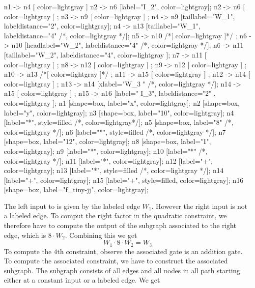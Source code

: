 \begin{example}
\begin{center}
{        n1 -> n4 [ color=lightgray ]
	n2 -> n6 [label="I_2", color=lightgray];
	n2 -> n6 [ color=lightgray ] ;
	n3 -> n9 [ color=lightgray ] ;
	n4 -> n9 [taillabel="W_1", labeldistance="2", color=lightgray];
	n4 -> n13 [taillabel="W_1", labeldistance="4" /*, color=lightgray */];
	n5 -> n10 /*[ color=lightgray ]*/ ;
	n6 -> n10 [headlabel="W_2", labeldistance="4" /*, color=lightgray */];
	n6 -> n11 [taillabel="W_2", labeldistance="4", color=lightgray ];
	n7 -> n11 [ color=lightgray ] ;
	n8 -> n12 [ color=lightgray ] ;
	n9 -> n12 [ color=lightgray ] ;
	n10 -> n13 /*[ color=lightgray ]*/ ; 
	n11 -> n15 [ color=lightgray ] ;
	n12 -> n14 [ color=lightgray ] ;	
	n13 -> n14 [xlabel="W_3  "  /*, color=lightgray */];
	n14 -> n15 [ color=lightgray ] ;
	n15 -> n16 [label="  I_3", labeldistance="2" , color=lightgray ];
	n1 [shape=box, label="x", color=lightgray];
	n2 [shape=box, label="y", color=lightgray];
	n3 [shape=box, label="10", color=lightgray];
	n4 [label="*", style=filled /*, color=lightgray*/];
	n5 [shape=box, label="8" /*, color=lightgray */];
	n6 [label="*", style=filled /*, color=lightgray */];
	n7 [shape=box, label="12", color=lightgray];
	n8 [shape=box, label="1", color=lightgray];
	n9 [label="*", color=lightgray];
	n10 [label="*" /*, color=lightgray */];
	n11 [label="*", color=lightgray];	
	n12 [label="+", color=lightgray];	
	n13 [label="*", style=filled /*, color=lightgray */];
	n14 [label="+", color=lightgray];
	n15 [label="+", style=filled, color=lightgray];
	n16 [shape=box, label="f_tiny-jj", color=lightgray];		
}
\end{center}
The left input to is given by the labeled edge $W_1$. However the right input is not a labeled edge. To comput the right factor in the quadratic constraint, we therefore have to compute the output of the subgraph associated to the right edge, which is $8\cdot W_2$. Combining this we get
$$
W_1\cdot 8\cdot W_2 = W_3
$$ 
To compute the $4$th constraint, observe the associated gate is an addition gate.  To compute the associated constraint, we have to construct the associated subgraph. The subgraph consists of all edges and all nodes in all path starting either at a constant input or a labeled edge. We get
\begin{center}
\end{center}
\end{example}
